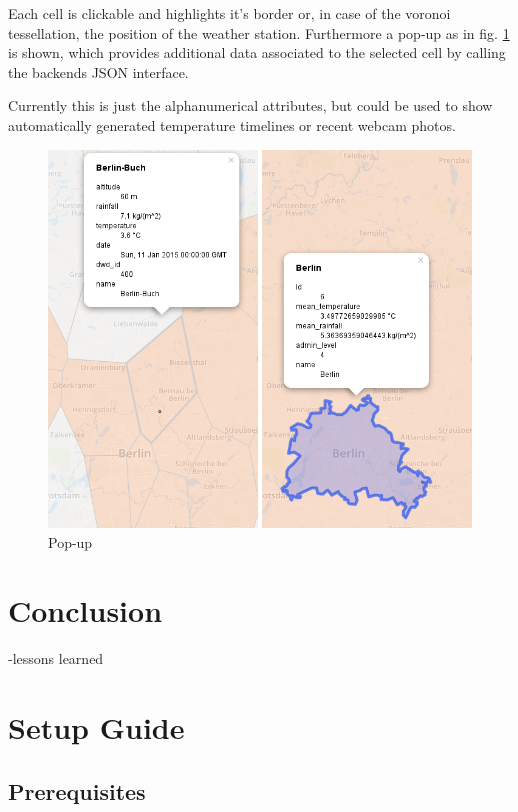 \documentclass[paper=a4, fontsize=11pt]{article} %
\numberwithin{equation}{section} %
\numberwithin{figure}{section} %
\numberwithin{table}{section} %
\begin{document}
\newpage
Each cell is clickable and highlights it's border or, in case of the
voronoi tessellation, the position of the weather station. Furthermore a
pop-up as in fig. \ref{fig:popup} is shown, which provides additional data associated to the
selected cell by calling the backends JSON interface.

Currently this is just the alphanumerical attributes, but could be used
to show automatically generated temperature timelines or recent webcam
photos. 

\begin{figure}[htbp]
\centering
\includegraphics[width=1\textwidth]{pictures/screenshot-popup.png}
\caption{Pop-up}
\label{fig:popup}
\end{figure}

\section{Conclusion}

-lessons learned










\section{Setup Guide}
\subsection{Prerequisites}
\end{document}

